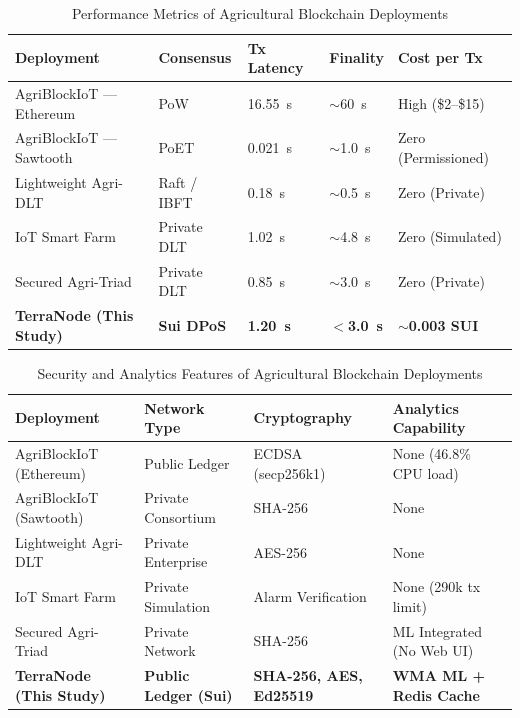 \begin{table}[H]
 \centering
 \small
 \singlespacing
 \renewcommand{\arraystretch}{1.15}
 \caption{Performance Metrics of Agricultural Blockchain Deployments}
 \label{tab:blockchain_comparative}
 \begin{tabularx}{\textwidth}{|>{\raggedright\arraybackslash}X|l|l|l|l|}
 \hline
 \textbf{Deployment} & \textbf{Consensus} & \textbf{Tx Latency} & \textbf{Finality} & \textbf{Cost per Tx} \\
 \hline
 AgriBlockIoT --- Ethereum~\parencite{caro2018blockchain} & PoW & 16.55~s & $\sim$60~s & High (\$2--\$15) \\
 \hline
 AgriBlockIoT --- Sawtooth~\parencite{caro2018blockchain} & PoET & 0.021~s & $\sim$1.0~s & Zero (Permissioned) \\
 \hline
 Lightweight Agri-DLT~\parencite{ktari2022agricultural} & Raft / IBFT & 0.18~s & $\sim$0.5~s & Zero (Private) \\
 \hline
 IoT Smart Farm~\parencite{aliyu2023blockchain} & Private DLT & 1.02~s & $\sim$4.8~s & Zero (Simulated) \\
 \hline
 Secured Agri-Triad~\parencite{layek2025secured} & Private DLT & 0.85~s & $\sim$3.0~s & Zero (Private) \\
 \hline
 \textbf{TerraNode (This Study)} & \textbf{Sui DPoS} & \textbf{1.20~s} & \textbf{$<$3.0~s} & \textbf{$\sim$0.003 SUI} \\
 \hline
 \end{tabularx}
 \end{table}
 
 \begin{table}[H]
 \centering
 \small
 \singlespacing
 \renewcommand{\arraystretch}{1.15}
 \caption{Security and Analytics Features of Agricultural Blockchain Deployments}
 \label{tab:blockchain_features}
 \begin{tabularx}{\textwidth}{|>{\raggedright\arraybackslash}p{3.8cm}|>{\raggedright\arraybackslash}p{2.8cm}|>{\raggedright\arraybackslash}p{3.0cm}|>{\raggedright\arraybackslash}X|}
 \hline
 \textbf{Deployment} & \textbf{Network Type} & \textbf{Cryptography} & \textbf{Analytics Capability} \\
 \hline
 AgriBlockIoT (Ethereum) & Public Ledger & ECDSA (secp256k1) & None (46.8\% CPU load) \\
 \hline
 AgriBlockIoT (Sawtooth) & Private Consortium & SHA-256 & None \\
 \hline
 Lightweight Agri-DLT & Private Enterprise & AES-256 & None \\
 \hline
 IoT Smart Farm & Private Simulation & Alarm Verification & None (290k tx limit) \\
 \hline
 Secured Agri-Triad & Private Network & SHA-256 & ML Integrated (No Web UI) \\
 \hline
 \textbf{TerraNode (This Study)} & \textbf{Public Ledger (Sui)} & \textbf{SHA-256, AES, Ed25519} & \textbf{WMA ML + Redis Cache} \\
 \hline
 \end{tabularx}
 \end{table}

